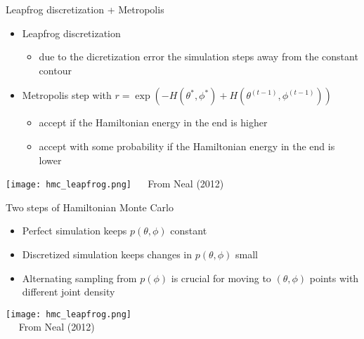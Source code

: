 \documentclass[finnish,english,t]{beamer}
\begin{document}
\begin{frame}{Leapfrog discretization + Metropolis}

  \vspace{-0.5\baselineskip}
  \begin{itemize}
  \item Leapfrog discretization
    \begin{itemize}
    \item due to the dicretization error the simulation steps away
      from the constant contour
    \end{itemize}
  \item<2-> Metropolis step with
    $r=\exp\left(-H(\theta^*,\phi^*)+H(\theta^{(t-1)},\phi^{(t-1)})\right)$
    \begin{itemize}
    \item accept if the Hamiltonian energy in the end is higher 
    \item accept with some probability if the Hamiltonian energy in
      the end is lower
    \end{itemize}
  \end{itemize}
    \vspace{-0.6\baselineskip}
    \begin{center}
      \texttt{[image: hmc\_leapfrog.png]}
      {\footnotesize~~ From Neal (2012)}
    \end{center}
\end{frame}

\begin{frame}{Two steps of Hamiltonian Monte Carlo}

  \vspace{-0.6\baselineskip}
  \begin{itemize}
  \item Perfect simulation keeps $p(\theta,\phi)$ constant
  \item<2-> Discretized simulation keeps changes in
    $p(\theta,\phi)$ small
  \item<3-> Alternating sampling from $p(\phi)$ is crucial for moving
    to $(\theta,\phi)$ points with different joint density
  \end{itemize}
  
  \texttt{[image: hmc\_leapfrog.png]}\\
      {\footnotesize~~ From Neal (2012)}

\end{frame}
\end{document}
